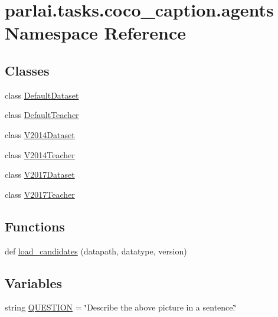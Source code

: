 \hypertarget{namespaceparlai_1_1tasks_1_1coco__caption_1_1agents}{}\section{parlai.\+tasks.\+coco\+\_\+caption.\+agents Namespace Reference}
\label{namespaceparlai_1_1tasks_1_1coco__caption_1_1agents}
\subsection*{Classes}
\begin{DoxyCompactItemize}
\item 
class \hyperlink{classparlai_1_1tasks_1_1coco__caption_1_1agents_1_1DefaultDataset}{Default\+Dataset}
\item 
class \hyperlink{classparlai_1_1tasks_1_1coco__caption_1_1agents_1_1DefaultTeacher}{Default\+Teacher}
\item 
class \hyperlink{classparlai_1_1tasks_1_1coco__caption_1_1agents_1_1V2014Dataset}{V2014\+Dataset}
\item 
class \hyperlink{classparlai_1_1tasks_1_1coco__caption_1_1agents_1_1V2014Teacher}{V2014\+Teacher}
\item 
class \hyperlink{classparlai_1_1tasks_1_1coco__caption_1_1agents_1_1V2017Dataset}{V2017\+Dataset}
\item 
class \hyperlink{classparlai_1_1tasks_1_1coco__caption_1_1agents_1_1V2017Teacher}{V2017\+Teacher}
\end{DoxyCompactItemize}
\subsection*{Functions}
\begin{DoxyCompactItemize}
\item 
def \hyperlink{namespaceparlai_1_1tasks_1_1coco__caption_1_1agents_aa190162d0e36e1c93fc224b8a049f0cf}{load\+\_\+candidates} (datapath, datatype, version)
\end{DoxyCompactItemize}
\subsection*{Variables}
\begin{DoxyCompactItemize}
\item 
string \hyperlink{namespaceparlai_1_1tasks_1_1coco__caption_1_1agents_a4e989be739e8abe5d76058add98dd9cf}{Q\+U\+E\+S\+T\+I\+ON} = \char`\"{}Describe the above picture in a sentence.\char`\"{}
\end{DoxyCompactItemize}


